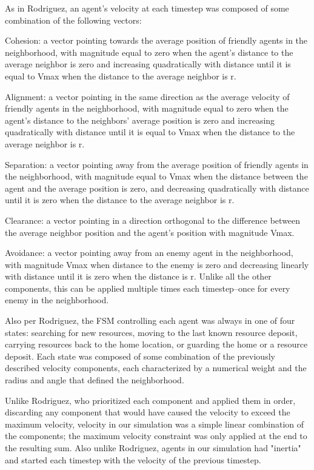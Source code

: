 \documentclass[12pt,journal,compsoc]{IEEEtran}
\begin{document}
As in Rodriguez, an agent's velocity at each timestep was composed of some combination of the following vectors:

Cohesion: a vector pointing towards the average position of friendly agents in the neighborhood, with magnitude equal to zero when the agent's distance to the average neighbor is zero and increasing quadratically with distance until it is equal to Vmax when the distance to the average neighbor is r.

Alignment: a vector pointing in the same direction as the average velocity of friendly agents in the neighborhood, with magnitude equal to zero when the agent's distance to the neighbors' average position is zero and increasing quadratically with distance until it is equal to Vmax when the distance to the average neighbor is r.

Separation: a vector pointing away from the average position of friendly agents in the neighborhood, with magnitude equal to Vmax when the distance between the agent and the average position is zero, and decreasing quadratically with distance until it is zero when the distance to the average neighbor is r.


Clearance: a vector pointing in a direction orthogonal to the difference between the average neighbor position and the agent's position with magnitude Vmax.

Avoidance: a vector pointing away from an enemy agent in the neighborhood, with magnitude Vmax when distance to the enemy is zero and decreasing linearly with distance until it is zero when the distance is r. Unlike all the other components, this can be applied multiple times each timestep--once for every enemy in the neighborhood.

Also per Rodriguez, the FSM controlling each agent was always in one of four states: searching for new resources, moving to the last known resource deposit, carrying resources back to the home location, or guarding the home or a resource deposit. Each state was composed of some combination of the previously described velocity components, each characterized by a numerical weight and the radius and angle that defined the neighborhood.

Unlike Rodriguez, who prioritized each component and applied them in order, discarding any component that would have caused the velocity to exceed the maximum velocity, velocity in our simulation was a simple linear combination of the components; the maximum velocity constraint was only applied at the end to the resulting sum. Also unlike Rodriguez, agents in our simulation had "inertia" and started each timestep with the velocity of the previous timestep.
\end{document}
